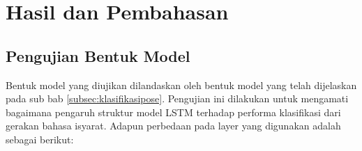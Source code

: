 \section{Hasil dan Pembahasan}
\label{sec:hasildanpembahasan}




% 


\subsection{Pengujian Bentuk Model}
\label{sec:analisismodel}
Bentuk model yang diujikan dilandaskan oleh bentuk model yang telah dijelaskan pada sub bab \ref{subsec:klasifikasipose}. Pengujian ini dilakukan untuk mengamati bagaimana pengaruh struktur model LSTM terhadap performa klasifikasi dari gerakan bahasa isyarat. Adapun perbedaan pada layer yang digunakan adalah sebagai berikut:

